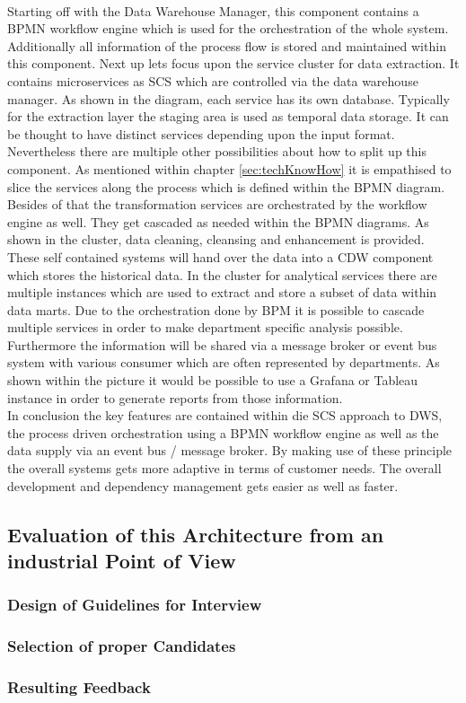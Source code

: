 \\
Starting off with the Data Warehouse Manager, this component contains a BPMN workflow engine which is used for the orchestration of the whole system. Additionally all information of the process flow is stored and maintained within this component. \newline
Next up lets focus upon the service cluster for data extraction. It contains microservices as SCS which are controlled via the data warehouse manager. As shown in the diagram, each service has its own database. Typically for the extraction layer the staging area is used as temporal data storage.  It can be thought to have distinct services depending upon the input format. Nevertheless there are multiple other possibilities about how to split up this component. As mentioned within chapter \ref{sec:techKnowHow} it is empathised to slice the services along the process which is defined within the BPMN diagram.\newline
Besides of that the transformation services are orchestrated by the workflow engine as well. They get cascaded as needed within the BPMN diagrams. As shown in the cluster, data cleaning, cleansing and enhancement is provided. These self contained systems will hand over the data into a CDW component which stores the historical data.\newline
In the cluster for analytical services there are multiple instances which are used to extract and store a subset of data within data marts. Due to the orchestration done by BPM it is possible to cascade multiple services in order to make department specific analysis possible. Furthermore the information will be shared via a message broker or event bus system with various consumer which are often represented by departments. As shown within the picture it would be possible to use a Grafana or Tableau instance in order to generate reports from those information.\newline
\\
In conclusion the key features are contained within die SCS approach to DWS, the process driven orchestration using a BPMN workflow engine as well as the data supply via an event bus / message broker. By making use of these principle the overall systems gets more adaptive in terms of customer needs. The overall development and dependency management gets easier as well as faster. 

\subsection{Evaluation of this Architecture from an industrial Point of View}
\subsubsection{Design of Guidelines for Interview}
\subsubsection{Selection of proper Candidates}
\subsubsection{Resulting Feedback}
